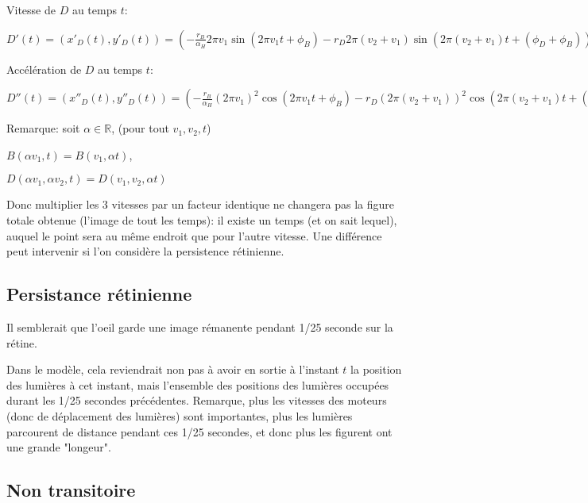 \documentclass[11pt,a4paper]{article}
\newcommand{\R}{\mathbb R}%
\begin{document}
Vitesse de $D$ au temps $t$:

$ D'(t) = (x'_D(t),y'_D(t)) = (-\frac{r_B}{\alpha_H} 2 \pi v_1 \sin(2 \pi v_1 t + \phi_B) - r_D 2 \pi (v_2 + v _1) \sin(2 \pi (v_2 + v _1)t + (\phi_D + \phi_B)), \frac{r_B}{\alpha_H} 2 \pi  v_1 \cos(2 \pi v_1 t + \phi_B ) + r_D  2 \pi (v_2 + v _1) \cos(2 \pi (v_2 +v_1)t +  (\phi_D + \phi_B))  )$



Accélération de $D$ au temps $t$:

$ D''(t) = (x''_D(t),y''_D(t)) = (-\frac{r_B}{\alpha_H} (2 \pi v_1)^2 \cos(2 \pi v_1 t + \phi_B) - r_D  (2 \pi (v_2 + v _1))^2 \cos(2 \pi (v_2 + v _1)t + (\phi_D + \phi_B)), - \frac{r_B}{\alpha_H} (2 \pi  v_1)^2 \sin(2 \pi v_1 t + \phi_B ) - r_D  (2 \pi (v_2 + v _1))^2 \sin(2 \pi (v_2 +v_1)t +  (\phi_D + \phi_B))  )$



Remarque: soit $\alpha \in \R$, (pour tout $v_1,v_2,t$)

$B(\alpha v_1,t) = B(v_1,\alpha t)$,

$D(\alpha v_1,\alpha v_2,t) = D(v_1,v_2,\alpha t)$

Donc multiplier les 3 vitesses par un facteur identique ne changera pas la figure totale obtenue (l'image de tout les temps): il existe un temps (et on sait lequel), auquel le point sera au même endroit que pour l'autre vitesse. Une différence peut intervenir si l'on considère la persistence rétinienne.




\subsection{Persistance rétinienne}

Il semblerait que l'oeil garde une image rémanente pendant 1/25 seconde sur la rétine.

Dans le modèle, cela reviendrait non pas à avoir en sortie à l'instant $t$ la position des lumières à cet instant, mais l'ensemble des positions des lumières occupées durant les 1/25 secondes précédentes. Remarque, plus les vitesses des moteurs (donc de déplacement des lumières) sont importantes, plus les lumières parcourent de distance pendant ces 1/25 secondes, et donc plus les figurent ont une grande "longeur".


\subsection{Non transitoire}
\end{document}
